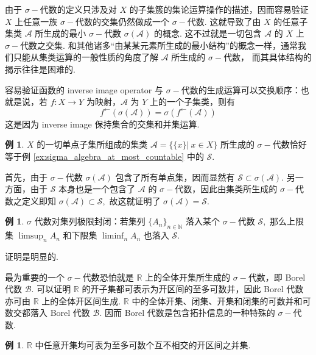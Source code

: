 \documentclass[12pt, a4paper, oneside]{book}
\numberwithin{figure}{section}
\theoremstyle{definition}
\newtheorem{example}[theorem]{例}
\begin{document}
由于 $\sigma-$代数的定义只涉及对 $X$ 的子集簇的集论运算操作的描述，因而容易验证 $X$ 上任意一族 $\sigma-$代数的交集仍然做成一个 $\sigma-$代数. 这就导致了由 $X$ 的任意子集类 $\mathcal A$ 所生成的最小 $\sigma-$代数 
$\sigma(\mathcal A)$ 的概念. 这不过就是一切包含 $\mathcal A$ 的 $X$ 上 $\sigma-$代数之交集. 和其他诸多``由某某元素所生成的最小结构''的概念一样，通常我们只能从集类运算的一般性质的角度了解 $\mathcal A$ 所生成的 $\sigma-$代数，
而其具体结构的揭示往往是困难的.

容易验证函数的 inverse image operator 与 $\sigma-$代数的生成运算可以交换顺序：也就是说，若 $f:X\to Y$ 为映射，$\mathcal A$ 为 $Y$ 上的一个子集类，则有
\begin{equation}\label{eq:commute_inverse_image_sigma_algebra_generation}
    f^\leftarrow(\sigma(\mathcal A))=\sigma(f^\leftarrow(\mathcal A))
\end{equation}
这是因为 inverse image 保持集合的交集和并集运算.

\begin{example}
    $X$ 的一切单点子集所组成的集类 $\mathcal A=\{\{x\}|\ x\in X\}$ 所生成的 $\sigma-$代数恰好等于例 \eqref{ex:sigma_algebra_at_most_countable} 中的 $\mathcal S.$
\end{example}
首先，由于 $\sigma-$代数 $\sigma(\mathcal A)$ 包含了所有单点集，因而显然有 $\mathcal S\subset \sigma(\mathcal A).$ 另一方面，由于 $\mathcal S$ 本身也是一个包含了 $\mathcal A$ 的 $\sigma-$代数，因此由集类所生成的 $\sigma-$代数之定义即知 $\sigma(\mathcal A)\subset\mathcal S,$ 故这就证明了 
$\sigma(\mathcal A)=\mathcal S.$ 

\begin{example}
    $\sigma$ 代数对集列极限封闭：若集列 $\{A_n\}_{n\in\mathbb N}$ 落入某个 $\sigma-$代数 $\mathcal S,$ 那么上限集 $\limsup_n A_n$ 和下限集 $\liminf_n A_n$ 也落入 $\mathcal S.$
\end{example}
证明是明显的.

最为重要的一个 $\sigma-$代数恐怕就是 $\mathbb R$ 上的全体开集所生成的 $\sigma-$代数，即 Borel 代数 $\mathcal B.$ 可以证明 $\mathbb R$ 的开子集都可表示为开区间的至多可数并，因此 Borel 代数亦可由 $\mathbb R$ 上的全体开区间生成.
$\mathbb R$ 中的全体开集、闭集、开集和闭集的可数并和可数交都落入 Borel 代数 $\mathcal B.$  因而 Borel 代数是包含拓扑信息的一种特殊的 $\sigma-$代数. 

\begin{example}
    $\mathbb R$ 中任意开集均可表为至多可数个互不相交的开区间之并集.
\end{example}
\end{document}

